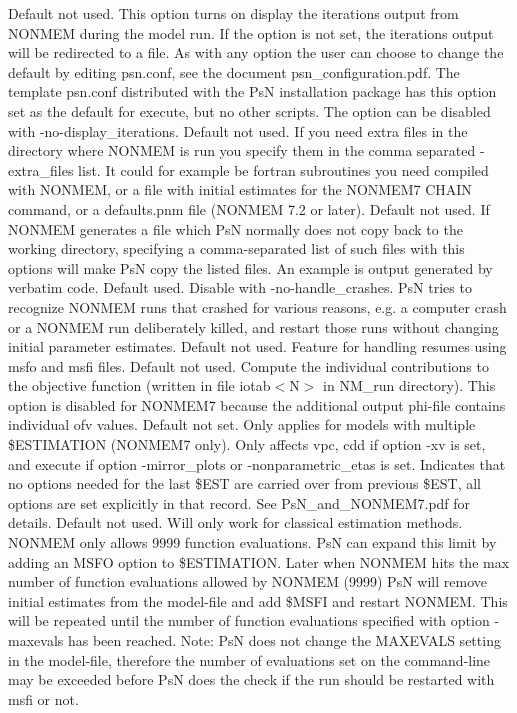 \begin{optionlist}
\nextopt
{}
Default not used.  This option turns on display the iterations output from NONMEM during the model run. If the option is not set, the iterations output will be redirected to a file. As with any option the user can choose to change the default by editing psn.conf, see the document psn\_configuration.pdf. The template psn.conf distributed with the PsN installation package has this option set as the default for execute, but no other scripts. The option can be disabled with -no-display\_iterations. 
\nextopt
{}
Default not used. If you need extra files in the directory where NONMEM is run you specify them in the comma separated -extra\_files list. It could for example be fortran subroutines you need compiled with NONMEM, or a file with initial estimates for the NONMEM7 CHAIN command, or a defaults.pnm file (NONMEM 7.2 or later). 
\nextopt
{}
Default not used. If NONMEM generates a file which PsN normally does not copy back to the working directory, specifying a comma-separated list of such files with this options will make PsN copy the listed files. An example is output generated by verbatim code. 
\nextopt
{}
Default used. Disable with -no-handle\_crashes. PsN tries to recognize NONMEM runs that crashed for various reasons, e.g. a computer crash or a NONMEM run deliberately killed, and restart those runs without changing initial parameter estimates. 
\nextopt
{}
Default not used. Feature for handling resumes using msfo and msfi files. 
\nextopt
{}
Default not used. Compute the individual contributions to the objective function (written in file iotab$<$N$>$ in NM\_run directory). This option is disabled for NONMEM7 because the additional output phi-file contains individual ofv values. 
\nextopt
{}
Default not set. Only applies for models with multiple \$ESTIMATION (NONMEM7 only). Only affects vpc,  cdd if option -xv is set, and execute if option -mirror\_plots or -nonparametric\_etas is set. Indicates that no options needed for the last \$EST are carried over from previous \$EST, all options are set explicitly in that record. See PsN\_and\_NONMEM7.pdf for details. 
\nextopt
{}
Default not used. Will only work for classical estimation methods. NONMEM only allows 9999 function evaluations. PsN can expand this limit by adding an MSFO option to \$ESTIMATION. Later when NONMEM hits the max number of function evaluations allowed by NONMEM (9999) PsN will remove initial estimates from the model-file and add \$MSFI and restart NONMEM. This will be repeated until the number of function evaluations specified with option -maxevals has been reached. Note: PsN does not change the MAXEVALS setting in the model-file, therefore the number of evaluations set on the command-line may be exceeded before PsN does the check if the run should be restarted with msfi or not. 

\end{optionlist}

